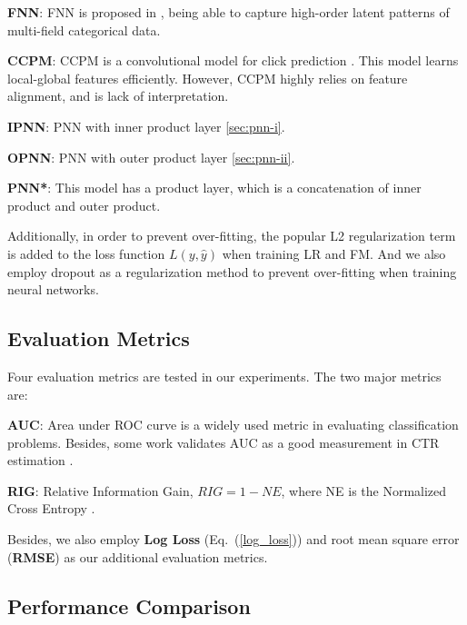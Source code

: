 \documentclass[conference]{IEEEtran}
\begin{document}
\textbf{FNN}: FNN is proposed in \cite{zhang2016deep}, being able to capture high-order latent patterns of multi-field categorical data.

\textbf{CCPM}: CCPM is a convolutional model for click prediction \cite{liu2015convolutional}. This model learns local-global features efficiently. However, CCPM highly relies on feature alignment, and is lack of interpretation.

\textbf{IPNN}: PNN with inner product layer \ref{sec:pnn-i}.

\textbf{OPNN}: PNN with outer product layer \ref{sec:pnn-ii}.

\textbf{PNN*}: This model has a product layer, which is a concatenation of inner product and outer product.






Additionally, in order to prevent over-fitting, the popular L2 regularization term is added to the loss function $ L(y,\hat{y})$ when training LR and FM.
And we also employ dropout as a regularization method to prevent over-fitting when training neural networks.





\subsection{Evaluation Metrics}
Four evaluation metrics are tested in our experiments. The two major metrics are:

\textbf{AUC}: Area under ROC curve is a widely used metric in evaluating classification problems. Besides, some work validates AUC as a good measurement in CTR estimation \cite{graepel2010web}.

\textbf{RIG}: Relative Information Gain, $RIG = 1 - NE$, where NE is the Normalized Cross Entropy \cite{he2014practical}.

Besides, we also employ \textbf{Log Loss} (Eq.~(\ref{log_loss})) and root mean square error (\textbf{RMSE}) as our additional evaluation metrics.


\subsection{Performance Comparison}
\end{document}
